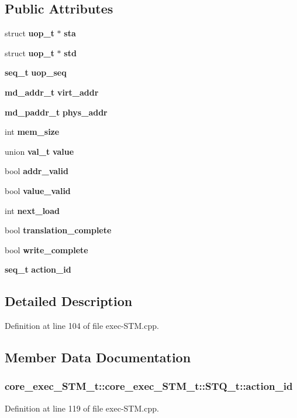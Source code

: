 \subsection*{Public Attributes}
\begin{CompactItemize}
\item 
struct {\bf uop\_\-t} $\ast$ {\bf sta}
\item 
struct {\bf uop\_\-t} $\ast$ {\bf std}
\item 
{\bf seq\_\-t} {\bf uop\_\-seq}
\item 
{\bf md\_\-addr\_\-t} {\bf virt\_\-addr}
\item 
{\bf md\_\-paddr\_\-t} {\bf phys\_\-addr}
\item 
int {\bf mem\_\-size}
\item 
union {\bf val\_\-t} {\bf value}
\item 
bool {\bf addr\_\-valid}
\item 
bool {\bf value\_\-valid}
\item 
int {\bf next\_\-load}
\item 
bool {\bf translation\_\-complete}
\item 
bool {\bf write\_\-complete}
\item 
{\bf seq\_\-t} {\bf action\_\-id}
\end{CompactItemize}


\subsection{Detailed Description}


Definition at line 104 of file exec-STM.cpp.

\subsection{Member Data Documentation}
\subsubsection[{action\_\-id}]{ core\_\-exec\_\-STM\_\-t::core\_\-exec\_\-STM\_\-t::STQ\_\-t::action\_\-id}\label{structcore__exec__STM__t_1_1STQ__t_3e0d5f0970009b0a53631fcfff3a84c2}




Definition at line 119 of file exec-STM.cpp.

